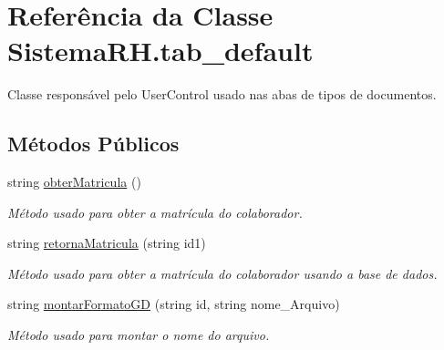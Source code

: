 \hypertarget{class_sistema_r_h_1_1tab__default}{
\section{Referência da Classe SistemaRH.tab\_\-default}
\label{class_sistema_r_h_1_1tab__default}
}


Classe responsável pelo UserControl usado nas abas de tipos de documentos.  


\subsection*{Métodos Públicos}
\begin{DoxyCompactItemize}
\item 
string \hyperlink{class_sistema_r_h_1_1tab__default_ace403d6c98f154544b734c1dda9a6fbf}{obterMatricula} ()
\begin{DoxyCompactList}\small\item\em Método usado para obter a matrícula do colaborador. \item\end{DoxyCompactList}\item 
string \hyperlink{class_sistema_r_h_1_1tab__default_af8f4a5067e0c8bee6578d934014e9b5f}{retornaMatricula} (string id1)
\begin{DoxyCompactList}\small\item\em Método usado para obter a matrícula do colaborador usando a base de dados. \item\end{DoxyCompactList}\item 
string \hyperlink{class_sistema_r_h_1_1tab__default_a1f9872759569204e9b450735b8171bab}{montarFormatoGD} (string id, string nome\_\-Arquivo)
\begin{DoxyCompactList}\small\item\em Método usado para montar o nome do arquivo. \item\end{DoxyCompactList}\end{DoxyCompactItemize}
